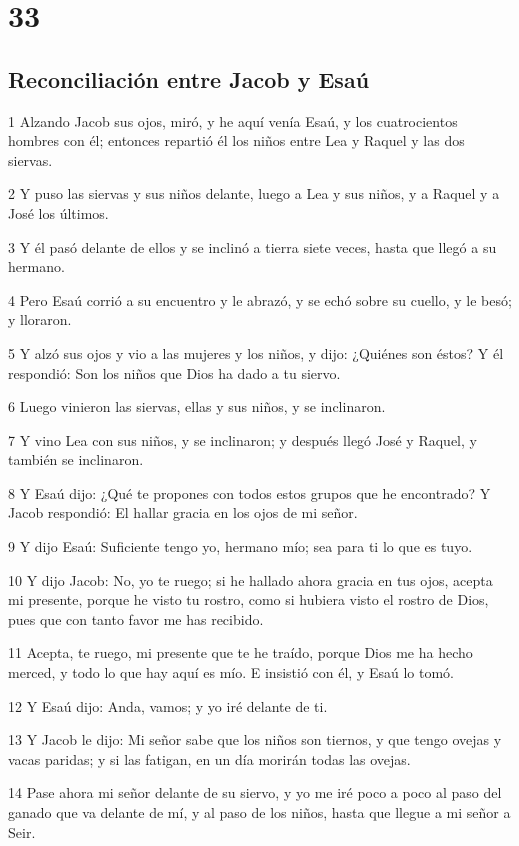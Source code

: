 \chapter{33}

\section*{Reconciliación entre Jacob y Esaú}

\par 1 Alzando Jacob sus ojos, miró, y he aquí venía Esaú, y los cuatrocientos hombres con él; entonces repartió él los niños entre Lea y Raquel y las dos siervas.
\par 2 Y puso las siervas y sus niños delante, luego a Lea y sus niños, y a Raquel y a José los últimos.
\par 3 Y él pasó delante de ellos y se inclinó a tierra siete veces, hasta que llegó a su hermano.
\par 4 Pero Esaú corrió a su encuentro y le abrazó, y se echó sobre su cuello, y le besó; y lloraron.
\par 5 Y alzó sus ojos y vio a las mujeres y los niños, y dijo: ¿Quiénes son éstos? Y él respondió: Son los niños que Dios ha dado a tu siervo.
\par 6 Luego vinieron las siervas, ellas y sus niños, y se inclinaron.
\par 7 Y vino Lea con sus niños, y se inclinaron; y después llegó José y Raquel, y también se inclinaron.
\par 8 Y Esaú dijo: ¿Qué te propones con todos estos grupos que he encontrado? Y Jacob respondió: El hallar gracia en los ojos de mi señor.
\par 9 Y dijo Esaú: Suficiente tengo yo, hermano mío; sea para ti lo que es tuyo.
\par 10 Y dijo Jacob: No, yo te ruego; si he hallado ahora gracia en tus ojos, acepta mi presente, porque he visto tu rostro, como si hubiera visto el rostro de Dios, pues que con tanto favor me has recibido.
\par 11 Acepta, te ruego, mi presente que te he traído, porque Dios me ha hecho merced, y todo lo que hay aquí es mío. E insistió con él, y Esaú lo tomó.
\par 12 Y Esaú dijo: Anda, vamos; y yo iré delante de ti.
\par 13 Y Jacob le dijo: Mi señor sabe que los niños son tiernos, y que tengo ovejas y vacas paridas; y si las fatigan, en un día morirán todas las ovejas.
\par 14 Pase ahora mi señor delante de su siervo, y yo me iré poco a poco al paso del ganado que va delante de mí, y al paso de los niños, hasta que llegue a mi señor a Seir.

